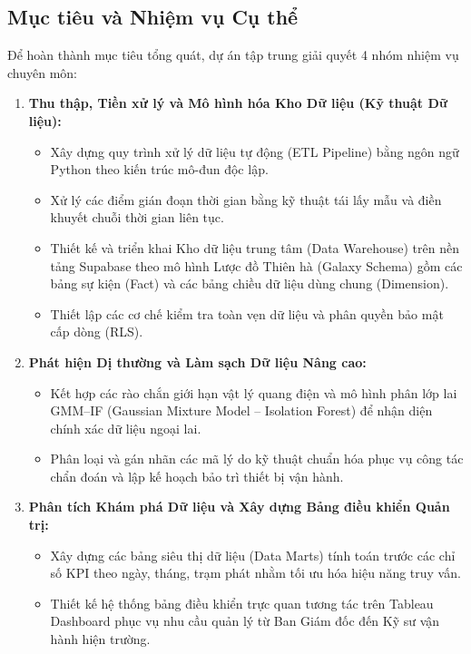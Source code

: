\documentclass[12pt, a4paper]{report}
\begin{document}
\subsection{Mục tiêu và Nhiệm vụ Cụ thể}
Để hoàn thành mục tiêu tổng quát, dự án tập trung giải quyết 4 nhóm nhiệm vụ chuyên môn:
\begin{enumerate}[label=\arabic*., leftmargin=*]
    \item \textbf{Thu thập, Tiền xử lý và Mô hình hóa Kho Dữ liệu (Kỹ thuật Dữ liệu):}
    \begin{itemize}[noitemsep]
        \item Xây dựng quy trình xử lý dữ liệu tự động (ETL Pipeline) bằng ngôn ngữ Python theo kiến trúc mô-đun độc lập.
        \item Xử lý các điểm gián đoạn thời gian bằng kỹ thuật tái lấy mẫu và điền khuyết chuỗi thời gian liên tục.
        \item Thiết kế và triển khai Kho dữ liệu trung tâm (Data Warehouse) trên nền tảng Supabase theo mô hình Lược đồ Thiên hà (Galaxy Schema) gồm các bảng sự kiện (Fact) và các bảng chiều dữ liệu dùng chung (Dimension).
        \item Thiết lập các cơ chế kiểm tra toàn vẹn dữ liệu và phân quyền bảo mật cấp dòng (RLS).
    \end{itemize}
    \item \textbf{Phát hiện Dị thường và Làm sạch Dữ liệu Nâng cao:}
    \begin{itemize}[noitemsep]
        \item Kết hợp các rào chắn giới hạn vật lý quang điện và mô hình phân lớp lai GMM--IF (Gaussian Mixture Model -- Isolation Forest) để nhận diện chính xác dữ liệu ngoại lai.
        \item Phân loại và gán nhãn các mã lý do kỹ thuật chuẩn hóa phục vụ công tác chẩn đoán và lập kế hoạch bảo trì thiết bị vận hành.
    \end{itemize}
    \item \textbf{Phân tích Khám phá Dữ liệu và Xây dựng Bảng điều khiển Quản trị:}
    \begin{itemize}[noitemsep]
        \item Xây dựng các bảng siêu thị dữ liệu (Data Marts) tính toán trước các chỉ số KPI theo ngày, tháng, trạm phát nhằm tối ưu hóa hiệu năng truy vấn.
        \item Thiết kế hệ thống bảng điều khiển trực quan tương tác trên Tableau Dashboard phục vụ nhu cầu quản lý từ Ban Giám đốc đến Kỹ sư vận hành hiện trường.
    \end{itemize}

\end{enumerate}
\end{document}
